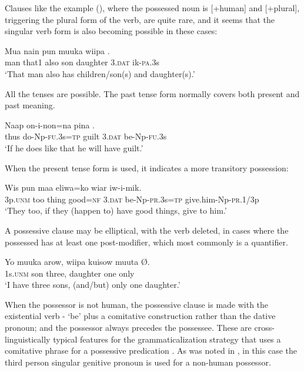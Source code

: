 Clauses like the example (), where the possessed noun is [+human] and [+plural], triggering the plural form of the verb, are quite rare, and it seems that the singular verb form is also becoming possible in these cases:

\ea%
\label{ex:x1321}
\gll Mua  nain  pun  muuka  wiipa   . \\
     man  that1  also  son  daughter  3.\textsc{dat}  ik-\textsc{pa}.3s \\
\glt `That man also has children/son(s) and daughter(s).'
\z

All the tenses are possible. The past tense form normally covers both present and past meaning.

\ea%
\label{ex:x1066}
\gll Naap  on-i-non=na  pina   . \\
     thus  do-Np-\textsc{fu}.3s=\textsc{tp}  guilt  3.\textsc{dat}  be-Np-\textsc{fu}.3s \\
\glt `If he does like that he will have guilt.'
\z

When the present tense form is used, it indicates a more transitory possession:

\ea%
\label{ex:x1201}
\gll Wis  pun  maa  eliwa=ko  wiar   iw-i-mik. \\
     3p.\textsc{unm}  too  thing  good=\textsc{nf}  3.\textsc{dat}  be-Np-\textsc{pr}.3s=\textsc{tp} give.him-Np-\textsc{pr}.1/3p \\
\glt `They too, if they (happen to) have good things, give to him.'
\z

A possessive clause may be elliptical, with the verb deleted, in cases where the possessed  has at least one post-modifier, which most commonly is a quantifier.

\ea%
\label{ex:x1322}
\gll Yo  muuka  arow,  wiipa  kuisow  muuta  {\O}. \\
     1s.\textsc{unm}  son  three,  daughter  one  only \\
\glt `I have three sons, (and/but) only one daughter.'
\z

When the possessor is not human, the possessive clause is made with the existential verb - `be' plus a comitative construction rather than the dative pronoun; and the possessor always precedes the possessee. These are cross-linguistically typical features for the grammaticalization strategy that uses a comitative phrase for a possessive predication \citep[53-57]{Heine1997}. As was noted in , in this case the third person singular genitive pronoun  is used for a non-human possessor.

